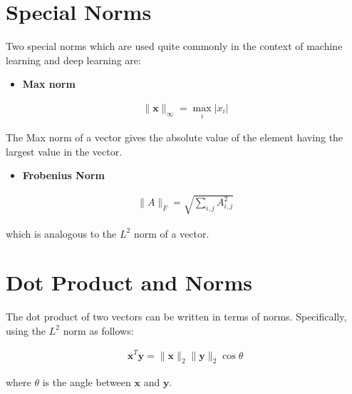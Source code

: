 \para

\section{Special Norms}

Two special norms which are used quite commonly in the context of machine learning and deep learning are:

\begin{itemize}
    \item \textbf{Max norm}
\end{itemize}

\begin{align}
\|\mathbf{x}\|_{\infty} = \max_{i} \left| x_{i} \right|
\end{align}
\para

The Max norm of a vector gives the absolute value of the element having the largest value in the vector.
\para

\begin{itemize}
    \item \textbf{Frobenius Norm}
\end{itemize}

\begin{align}
\|A\|_{F} = \sqrt{\sum_{i,j} A_{i,j}^{2}}
\end{align}
\para

which is analogous to the \(L^{2}\) norm of a vector.

\section{Dot Product and Norms}

The dot product of two vectors can be written in terms of norms. Specifically, using the \(L^{2}\) norm as follows:

\begin{align}
\mathbf{x}^{T}\mathbf{y} = \|\mathbf{x}\|_{2} \|\mathbf{y}\|_{2} \cos \theta
\end{align}
\para

where \(\theta\) is the angle between \(\mathbf{x}\) and \(\mathbf{y}\).
